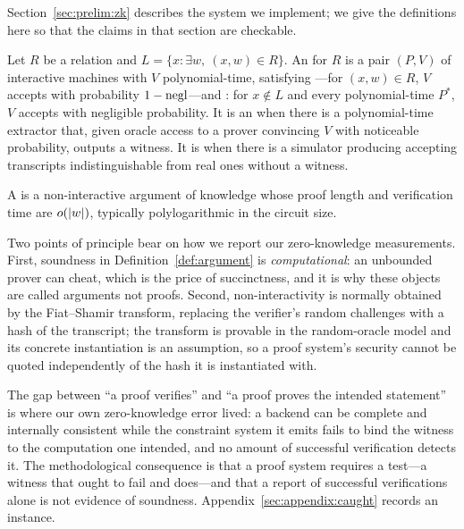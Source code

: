 Section~\ref{sec:prelim:zk} describes the system we implement; we give the
definitions here so that the claims in that section are checkable.

\begin{definition}
\label{def:argument}
Let $R$ be a relation and $L = \{x : \exists w,\ (x,w) \in R\}$. An
 for $R$ is a pair $(P,V)$ of interactive machines with
$V$ polynomial-time, satisfying ---for $(x,w) \in R$, $V$ accepts
with probability $1 - \mathrm{negl}$---and : for $x \notin L$
and every polynomial-time $P^*$, $V$ accepts with negligible probability. It is
an  when there is a polynomial-time extractor that,
given oracle access to a prover convincing $V$ with noticeable probability,
outputs a witness. It is  when there is a simulator producing
accepting transcripts indistinguishable from real ones without a witness.
\end{definition}

\begin{definition}
\label{def:snark}
A  is a non-interactive argument of knowledge whose proof length and
verification time are $o(\left\lvert w \right\rvert)$, typically polylogarithmic in the circuit size.
\end{definition}

Two points of principle bear on how we report our zero-knowledge measurements.
First, soundness in Definition~\ref{def:argument} is \emph{computational}: an
unbounded prover can cheat, which is the price of succinctness, and it is why
these objects are called arguments not proofs. Second, non-interactivity
is normally obtained by the Fiat--Shamir transform, replacing the verifier's
random challenges with a hash of the transcript; the transform is provable in the
random-oracle model and its concrete instantiation is an assumption, so a proof
system's security cannot be quoted independently of the hash it is instantiated
with.

\begin{remark}
\label{rem:zk-lesson}
The gap between ``a proof verifies'' and ``a proof proves the intended statement''
is where our own zero-knowledge error lived: a backend can be complete and
internally consistent while the constraint system it emits fails to bind the
witness to the computation one intended, and no amount of successful verification
detects it. The methodological consequence is that a proof system requires a
 test---a witness that ought to fail and does---and that a report of
successful verifications alone is not evidence of soundness.
Appendix~\ref{sec:appendix:caught} records an instance.
\end{remark}
